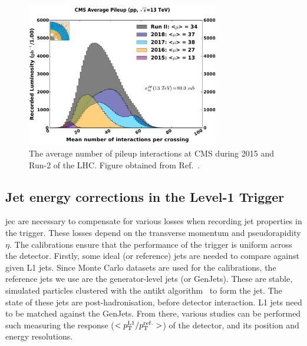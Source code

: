 \begin{figure}[htbp]
    \centering
    \includegraphics[width=0.75\textwidth]{figures/pileup_allYears_run2.pdf}
    \caption[The average number of pileup interactions at CMS during 2015 and Run-2 of the LHC]{The average number of pileup interactions at CMS during 2015 and Run-2 of the LHC. Figure obtained from Ref.~.}
    \label{fig:detector_cms_pileup}
\end{figure}


\subsection{Jet energy corrections in the Level-1 Trigger}
\label{subsubsec:detector_jecs}

\Gls{jec} are necessary to compensate for various losses when recording jet properties in the trigger. These losses depend on the transverse momentum \pt and pseudorapidity $\eta$. The calibrations ensure that the performance of the trigger is uniform across the detector. Firstly, some ideal (or reference) jets are needed to compare against given L1 jets. Since Monte Carlo datasets are used for the calibrations, the reference jets we use are the generator-level jets (or GenJets). These are stable, simulated particles clustered with the \gls{antikt} algorithm~\cite{Cacciari:2008gp} to form the jet. The state of these jets are post-hadronisation, before detector interaction. L1 jets need to be matched against the GenJets. From there, various studies can be performed such measuring the response ($< p_{\mathrm{T}}^{{\mathrm{L1}}} / p_{\mathrm{T}}^{{\mathrm{ref.}}} >$) of the detector, and its position and energy resolutions.

